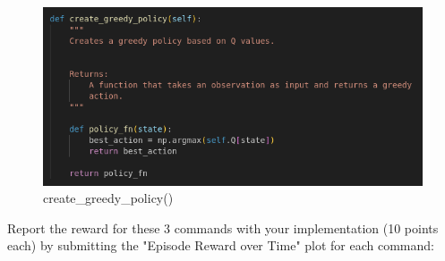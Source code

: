 \documentclass[a4paper]{article}
\theoremstyle{definition}
\begin{document}
\begin{figure}[H]
    \centering
    \includegraphics[width=6in]{3_create_greedy_policy.png}
    \caption{create\_greedy\_policy()}
    \label{fig:gan_q1_loss}
\end{figure}

\newpage
Report the reward for these 3 commands with your implementation (10 points each) by submitting the "Episode Reward over Time" plot for each command:
\end{document}
